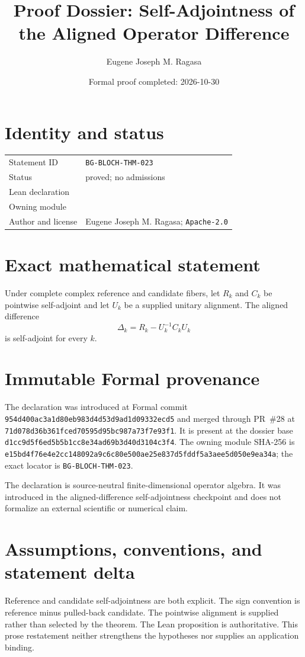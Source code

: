 \documentclass[11pt]{article}
\title{Proof Dossier: Self-Adjointness of the Aligned Operator Difference}
\author{Eugene Joseph M. Ragasa}
\date{Formal proof completed: 2026-10-30}
\begin{document}
\raggedright
\maketitle

\section{Identity and status}
\begin{tabularx}{\textwidth}{@{}lY@{}}
\toprule
Statement ID & \texttt{BG-BLOCH-THM-023} \\
Status & proved; no admissions \\
Lean declaration &  \\
Owning module &  \\
Author and license & Eugene Joseph M. Ragasa; \texttt{Apache-2.0} \\
\bottomrule
\end{tabularx}

\section{Exact mathematical statement}
Under complete complex reference and candidate fibers, let $R_k$ and $C_k$ be pointwise self-adjoint and let $U_k$ be a supplied unitary alignment.  The aligned difference
\[
  \Delta_k=R_k-U_k^{-1}C_kU_k
\]
is self-adjoint for every $k$.

\section{Immutable Formal provenance}
The declaration was introduced at Formal commit
\texttt{954d400ac3a1d80eb983d4d53d9ad1d09332ecd5} and merged through PR~\#28 at
\texttt{71d078d36b361fced70595d95bc987a73f7e93f1}.  It is present at the dossier base
\texttt{d1cc9d5f6ed5b5b1cc8e34ad69b3d40d3104c3f4}.  The owning module SHA-256 is
\texttt{e15bd4f76e4e2cc148092a9c6c80e500ae25e837d5fddf5a3aee5d050e9ea34a}; the exact locator is \texttt{BG-BLOCH-THM-023}.

The declaration is source-neutral finite-dimensional operator algebra.  It was introduced in the aligned-difference self-adjointness checkpoint and does not formalize an external scientific or numerical claim.

\section{Assumptions, conventions, and statement delta}
Reference and candidate self-adjointness are both explicit.  The sign convention is reference minus pulled-back candidate.  The pointwise alignment is supplied rather than selected by the theorem.
The Lean proposition is authoritative.  This prose restatement neither strengthens the hypotheses
nor supplies an application binding.
\end{document}
